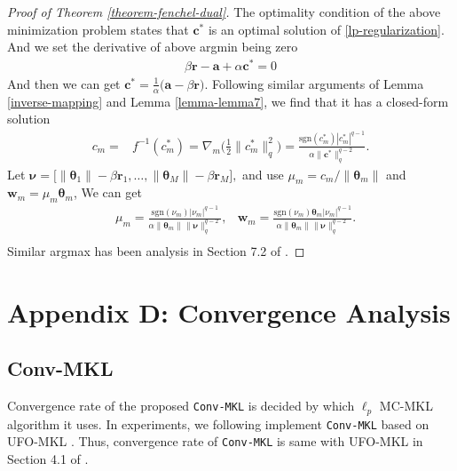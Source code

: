 \documentclass{article}
\begin{document}
\begin{proof}[Proof of Theorem \ref{theorem-fenchel-dual}]
The optimality condition of the above minimization problem \cite{rockafellar2015convex} states that $\pmb{c}^\ast$ is an optimal solution of \eqref{lp-regularization}. And we set the derivative of above argmin being zero
\begin{align}
    \label{l2-regularization-subgradient}
        \beta\mathbf{r}-\mathbf{a}+\alpha\pmb{c}^\ast=0
\end{align}
And then we can get $\pmb{c}^\ast=\frac{1}{\alpha}\Big(\mathbf{a}-\beta\mathbf{r}\Big)$.
Following similar arguments of Lemma \ref{inverse-mapping} and Lemma \ref{lemma-lemma7}, we find that it has a closed-form solution
\begin{align*}
    c_m=&f ^{-1}(c_m^\ast)=\nabla_m\Big(\frac{1}{2}\|{c}_m^\ast\|_q^2\Big)
    =\frac{\mathrm{sgn}({c}_m^\ast)|{c}_m^\ast|^{q-1}}{\alpha\|\pmb{c}^\ast\|_q^{q-2}}.
\end{align*}
Let
$
    \bm \nu=\Big[\|\pmb{\theta}_1\|-\beta\mathbf{r}_1,\ldots,
    \|\pmb{\theta}_M\|-\beta\mathbf{r}_M\Big],
$
and use $\mu_m=c_m/\|\pmb{\theta}_m\|$ and $\mathbf w_m=\mu_m\pmb{\theta}_m$, We can get
\begin{align*}
    &{\mu}_m=\frac{\mathrm{sgn}(\nu_m)|\nu_m|^{q-1}}{\alpha\|\pmb{\theta}_m\|\|\bm \nu\|_q^{q-2}},
    &\mathbf w_m=\frac{\mathrm{sgn}(\nu_m)\pmb{\theta}_m|\nu_m|^{q-1}}{\alpha\|\pmb{\theta}_m\|\|\bm \nu\|_q^{q-2}}.\\
\end{align*}
Similar argmax has been analysis in Section 7.2 of \cite{Xiao10}.
\end{proof}
\section{Appendix D: Convergence Analysis}
\subsection{Conv-MKL}
Convergence rate of the proposed \texttt{Conv-MKL} is decided by which $\ell_p$ MC-MKL algorithm it uses.
In experiments, we following implement \texttt{Conv-MKL} based on UFO-MKL \cite{OrabonaL11}.
Thus, convergence rate of \texttt{Conv-MKL} is same with UFO-MKL in Section 4.1 of \cite{OrabonaL11}.
\end{document}

